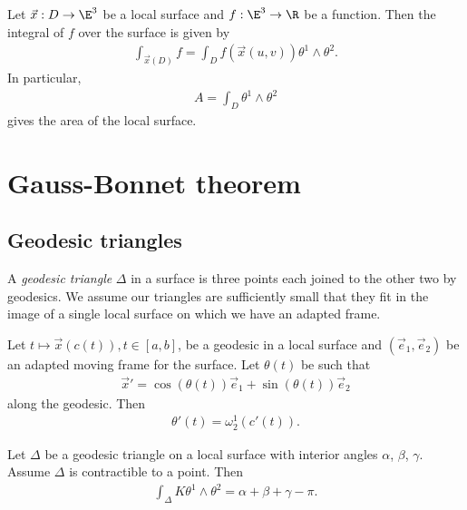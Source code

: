 \documentclass{article}
\begin{document}
\begin{corollary}
    Let $\vec x: D\to\E^3$ be a local surface and $f:\E^3\to\R$ be a function. Then 
    the integral of $f$ over the surface is given by 
    \begin{align*}
        \int_{\vec x(D)} f = \int_D f(\vec x(u,v))\theta^1\wedge\theta^2.
    \end{align*}
    In particular, 
    \begin{align*}
        A = \int_D \theta^1\wedge\theta^2
    \end{align*}
    gives the area of the local surface. 
\end{corollary}

\section{Gauss-Bonnet theorem}

\subsection{Geodesic triangles}

\begin{definition}
    A \emph{geodesic triangle} $\Delta$ in a surface is three points each joined to the other 
    two by geodesics. We assume our triangles are sufficiently small that they fit in the image 
    of a single local surface on which we have an adapted frame.
\end{definition}

\begin{proposition}
    Let $t\mapsto \vec x(c(t)), t\in[a,b]$, be a geodesic in a local surface and $(\vec e_1, \vec e_2)$
    be an adapted moving frame for the surface. Let $\theta(t)$ be such that 
    \begin{align*}
        \vec x' = \cos(\theta(t)) \vec e_1 + \sin(\theta(t)) \vec e_2
    \end{align*}
    along the geodesic. Then 
    \begin{align*}
        \theta'(t) = \omega_2^1 (c'(t)).
    \end{align*}
\end{proposition}

\begin{theorem}
    Let $\Delta$ be a geodesic triangle on a local surface with interior angles $\alpha$, $\beta$,
    $\gamma$. Assume $\Delta$ is contractible to a point. Then 
    \begin{align*}
        \int_\Delta K\theta^1\wedge\theta^2 = \alpha + \beta + \gamma - \pi.
    \end{align*}
\end{theorem}
\end{document}
